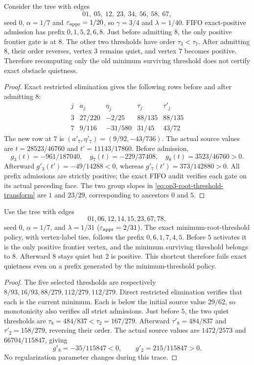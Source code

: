 \begin{proposition}
\label{prop:op3-tree-fixed-threshold-order}
Consider the tree with edges
\[
 01,\ 05,\ 12,\ 23,\ 34,\ 56,\ 58,\ 67,
\]
seed $0$, $\alpha=1/7$ and $\varepsilon_{\mathrm{appr}}=1/20$, so
$\gamma=3/4$ and $\lambda=1/40$. FIFO exact-positive admission has prefix
$0,1,5,2,6,8$. Just before admitting $8$, the only positive frontier gate
is at $8$. The other two thresholds have order $\tau_3<\tau_7$.
After admitting $8$, their order reverses, vertex $3$ remains quiet, and
vertex $7$ becomes positive. Therefore recomputing only the old minimum
surviving threshold does not certify exact obstacle quietness.
\end{proposition}
\begin{proof}
Exact restricted elimination gives the following rows before and after
admitting $8$:
\[
\begin{array}{c|c|c|c|c}
 j&a_j&\eta_j&\tau_j&\tau'_j\\\hline
 3&27/220&-2/25&88/135&88/135\\
 7&9/116&-31/580&31/45&43/72
\end{array}
\]
The new row at $7$ is $(a'_7,\eta'_7)=(9/92,-43/736)$.
The actual source values are
$t=28523/46760$ and $t'=11143/17860$. Before admission,
\[
 g_3(t)=-961/187040,
 \quad g_7(t)=-229/37408,
 \quad g_8(t)=3523/46760>0.
\]
Afterward $g'_3(t')=-49/14288<0$, whereas
$g'_7(t')=373/142880>0$. All prefix admissions are strictly positive;
the exact FIFO audit verifies each gate on its actual preceding face.
The two group slopes in \cref{eq:op3-root-threshold-transform} are $1$
and $23/29$, corresponding to ancestors $0$ and $5$.
\end{proof}

\begin{proposition}
\label{prop:op3-tree-minimum-policy-order}
Use the tree with edges
\[
 01,06,12,14,15,23,67,78,
\]
seed $0$, $\alpha=1/7$, and
$\lambda=1/31$ ($\varepsilon_{\mathrm{appr}}=2/31$). The exact minimum-root-threshold policy,
with vertex-label ties, follows the prefix $0,6,1,7,4,5$.
Before $5$ activates it is the only positive frontier vertex, and the
minimum surviving threshold belongs to $8$. Afterward $8$ stays quiet
but $2$ is positive. This shortcut therefore fails exact quietness even on
a prefix generated by the minimum-threshold policy.
\end{proposition}
\begin{proof}
The five selected thresholds are respectively
$8/93,16/93,88/279,112/279,112/279$. Direct restricted elimination verifies
that each is the current minimum. Each is below the initial source value
$29/62$, so monotonicity also verifies all strict admissions. Just before
$5$, the two quiet thresholds are
$\tau_8=484/837<\tau_2=167/279$.
Afterward $\tau'_8=484/837$ and $\tau'_2=158/279$, reversing their order.
The actual source values are $1472/2573$ and $66704/115847$, giving
\[
 g'_8=-35/115847<0,\qquad g'_2=215/115847>0.
\]
No regularization parameter changes during this trace.
\end{proof}

